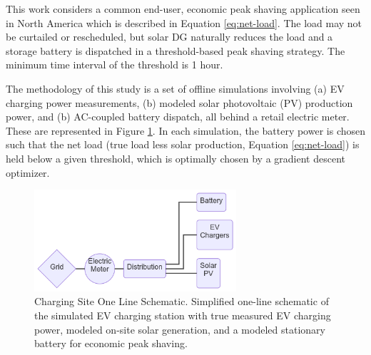 \documentclass[journal,article,submit,pdftex,moreauthors]{Definitions/mdpi}
\begin{document}
  This work considers a common end-user, economic peak shaving application seen in North America which is described in Equation \ref{eq:net-load}. The load may not be curtailed or rescheduled, but solar DG naturally reduces the load and a storage battery is dispatched in a threshold-based peak shaving strategy. The minimum time interval of the threshold is 1 hour.

  The methodology of this study is a set of offline simulations involving (a) EV charging power measurements, (b) modeled solar photovoltaic (PV) production power, and (b) AC-coupled battery dispatch, all behind a retail electric meter. These are represented in Figure \ref{fig:oneline}. In each simulation, the battery power is chosen such that the net load (true load less solar production, Equation \ref{eq:net-load}) is held below a given threshold, which is optimally chosen by a gradient descent optimizer.


  \begin{figure}
    \centering
    \includegraphics[width=7.5cm]{./images/oneline.png}
    \caption{Charging Site One Line Schematic. Simplified one-line schematic of the simulated EV charging station with true measured EV charging power, modeled on-site solar generation, and a modeled stationary battery for economic peak shaving.}
    \label{fig:oneline}
  \end{figure}
\end{document}
